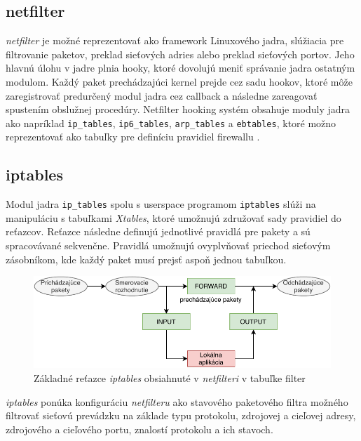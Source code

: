 \subsection{netfilter}
\emph{netfilter} je možné reprezentovať ako framework Linuxového jadra, slúžiacia pre filtrovanie paketov, preklad sieťových adries alebo preklad sieťových portov. Jeho hlavnú úlohu v jadre plnia hooky, ktoré dovolujú meniť správanie jadra ostatným modulom. Každý paket prechádzajúci kernel prejde cez sadu hookov, ktoré môže zaregistrovať predurčený modul jadra cez callback a následne zareagovať spustením obslužnej procedúry. Netfilter hooking systém obsahuje moduly jadra ako napríklad \texttt{ip\_tables}, \texttt{ip6\_tables}, \texttt{arp\_tables} a \texttt{ebtables}, ktoré možno reprezentovať ako tabuľky pre definíciu pravidiel firewallu \cite{netfilter, manpages}. 

\subsection{iptables}
Modul jadra \texttt{ip\_tables} spolu s userspace programom \texttt{iptables} slúži na manipuláciu s tabuľkami \emph{Xtables}, ktoré umožnujú združovať sady pravidiel do reťazcov. Reťazce následne definujú jednotlivé pravidlá pre pakety a sú spracovávané sekvenčne. Pravidlá umožnujú ovyplvňovať priechod sieťovým zásobníkom, kde každý paket musí prejsť aspoň jednou tabuľkou.
\cite{iptables_le, netfilter, manpages}
\begin{figure}[h]
	\centering
	\label{iptables}
	\includegraphics[scale=1.07]{obrazky-figures/iptables.pdf}
	\caption{Základné reťazce \emph{iptables} obsiahnuté v \emph{netfilteri} v tabuľke filter}
\end{figure}
                                                                                              
\emph{iptables} ponúka konfiguráciu \emph{netfilteru} ako stavového paketového filtra možného filtrovať sieťovú prevádzku na základe typu protokolu, zdrojovej a cieľovej adresy, zdrojového a cieľového portu, znalostí protokolu a ich stavoch. 

